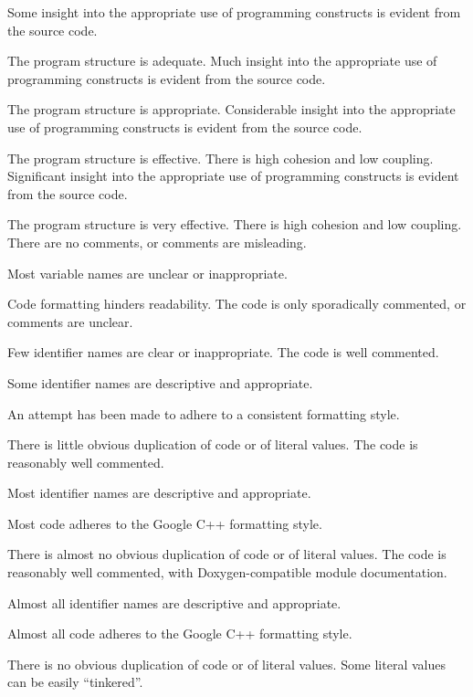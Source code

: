 \documentclass{../fal_assignment}
\begin{document}
\begin{markingrubric}
        \grade Some insight into the appropriate use of programming constructs is evident from the source code.
            \par The program structure is adequate.
        \grade Much insight into the appropriate use of programming constructs is evident from the source code.
            \par The program structure is appropriate.
        \grade Considerable insight into the appropriate use of programming constructs is evident from the source code.
            \par The program structure is effective. There is high cohesion and low coupling.
        \grade Significant insight into the appropriate use of programming constructs is evident from the source code.
            \par The program structure is very effective. There is high cohesion and low coupling.
%
        \grade\fail There are no comments, or comments are misleading.
            \par Most variable names are unclear or inappropriate.
            \par Code formatting hinders readability.
        \grade The code is only sporadically commented, or comments are unclear.
            \par Few identifier names are clear or inappropriate.
        \grade The code is well commented.
            \par Some identifier names are descriptive and appropriate.
            \par An attempt has been made to adhere to a consistent formatting style.
             \par There is little obvious duplication of code or of literal values.           
        \grade The code is reasonably well commented.
            \par Most identifier names are descriptive and appropriate.
            \par Most code adheres to the Google C++ formatting style.
             \par There is almost no obvious duplication of code or of literal values.   
        \grade The code is reasonably well commented, with Doxygen-compatible module documentation.
            \par Almost all identifier names are descriptive and appropriate.
            \par Almost all code adheres to the Google C++ formatting style.
             \par There is no obvious duplication of code or of literal values. Some literal values can be easily ``tinkered''. 

\end{markingrubric}
\end{document}
